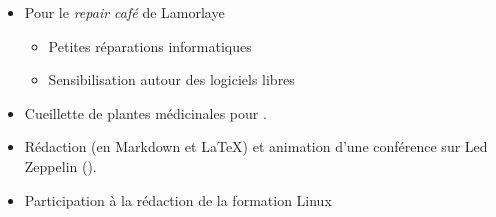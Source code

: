 {\begin{itemize}
\begin{itemize}
                \item{Visionnage et sélection de films,}
                \item{Présentation des films pour l'édition 2022,}
                \item{Animation des débats post projection.}
            \end{itemize}
        \item{Pour le \textit{repair café}  de Lamorlaye}
            \begin{itemize}
                \item{Petites réparations informatiques}
                \item{Sensibilisation autour des logiciels libres}
            \end{itemize}
        \item{Cueillette de plantes médicinales pour }.
        \item{Rédaction (en Markdown et \LaTeX) et animation d'une conférence sur Led Zeppelin ().}
        \item{Participation à la rédaction de la formation Linux }
    \end{itemize}
}



